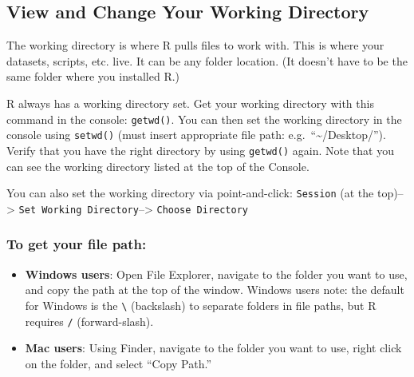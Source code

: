\documentclass[]{article}
\providecommand{\tightlist}{%
  \setlength{\itemsep}{0pt}\setlength{\parskip}{0pt}}
\begin{document}
\hypertarget{view-and-change-your-working-directory}{%
\subsection{View and Change Your Working
Directory}\label{view-and-change-your-working-directory}}

The working directory is where R pulls files to work with. This is where
your datasets, scripts, etc. live. It can be any folder location. (It
doesn't have to be the same folder where you installed R.)

R always has a working directory set. Get your working directory with
this command in the console: \texttt{getwd()}. You can then set the
working directory in the console using \texttt{setwd()} (must insert
appropriate file path: e.g.~``\textasciitilde/Desktop/''). Verify that
you have the right directory by using \texttt{getwd()} again. Note that
you can see the working directory listed at the top of the Console.

You can also set the working directory via point-and-click:
\texttt{Session} (at the top)--\textgreater{}
\texttt{Set\ Working\ Directory}--\textgreater{}
\texttt{Choose\ Directory}

\hypertarget{to-get-your-file-path}{%
\subsubsection{To get your file path:}\label{to-get-your-file-path}}

\begin{itemize}
\tightlist
\item
  \textbf{Windows users}: Open File Explorer, navigate to the folder you
  want to use, and copy the path at the top of the window. Windows users
  note: the default for Windows is the \texttt{\textbackslash{}}
  (backslash) to separate folders in file paths, but R requires
  \texttt{/} (forward-slash).
\item
  \textbf{Mac users}: Using Finder, navigate to the folder you want to
  use, right click on the folder, and select ``Copy Path.''
\end{itemize}
\end{document}
